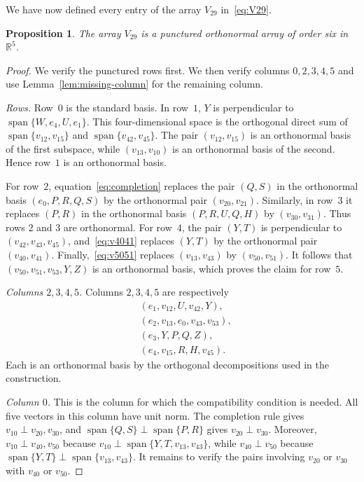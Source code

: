 \documentclass[11pt]{article}
\newtheorem{proposition}[theorem]{Proposition}
\theoremstyle{definition}
\newcommand{\R}{\mathbb R}
\newcommand{\spn}{\operatorname{span}}
\begin{document}
We have now defined every entry of the array $V_{29}$ in~\eqref{eq:V29}.

\begin{proposition}\label{prop:V29}
The array $V_{29}$ is a punctured orthonormal array of order six in $\R^5$.
\end{proposition}

\begin{proof}
We verify the punctured rows first.  We then verify columns $0,2,3,4,5$ and
use Lemma~\ref{lem:missing-column} for the remaining column.

\emph{Rows.}
Row~$0$ is the standard basis.  In row~$1$, $Y$ is perpendicular
to $\spn\{W,e_4,U,e_1\}$.  This four-dimensional space is the orthogonal
direct sum of $\spn\{v_{12},v_{15}\}$ and
$\spn\{v_{42},v_{45}\}$.  The pair $(v_{12},v_{15})$ is an orthonormal basis
of the first subspace, while $(v_{13},v_{10})$ is an orthonormal basis of the
second.  Hence row~$1$ is an orthonormal basis.

For row~$2$, equation~\eqref{eq:completion} replaces the pair $(Q,S)$ in the
orthonormal basis $(e_0,P,R,Q,S)$ by the orthonormal pair $(v_{20},v_{21})$.
Similarly, in row~$3$ it replaces $(P,R)$ in the orthonormal basis
$(P,R,U,Q,H)$ by $(v_{30},v_{31})$.  Thus rows $2$ and $3$ are orthonormal.
For row~$4$, the pair $(Y,T)$ is perpendicular to
$(v_{42},v_{43},v_{45})$, and~\eqref{eq:v4041} replaces $(Y,T)$ by the
orthonormal pair $(v_{40},v_{41})$.  Finally,~\eqref{eq:v5051} replaces
$(v_{13},v_{43})$ by $(v_{50},v_{51})$.  It follows that
$(v_{50},v_{51},v_{53},Y,Z)$ is an orthonormal basis, which proves the claim
for row~$5$.

\emph{Columns $2,3,4,5$.}
Columns $2,3,4,5$ are respectively
\begin{align*}
&(e_1,v_{12},U,v_{42},Y),\\
&(e_2,v_{13},e_0,v_{43},v_{53}),\\
&(e_3,Y,P,Q,Z),\\
&(e_4,v_{15},R,H,v_{45}).
\end{align*}
Each is an orthonormal basis by the orthogonal decompositions used in the
construction.

\emph{Column $0$.}
This is the column for which the compatibility condition is needed.  All five
vectors in this column have unit norm.  The completion rule gives
$v_{10}\perp v_{20},v_{30}$, and
$\spn\{Q,S\}\perp\spn\{P,R\}$ gives $v_{20}\perp v_{30}$.  Moreover,
$v_{10}\perp v_{40},v_{50}$ because
$v_{10}\perp\spn\{Y,T,v_{13},v_{43}\}$, while
$v_{40}\perp v_{50}$ because
$\spn\{Y,T\}\perp\spn\{v_{13},v_{43}\}$.  It remains to verify the pairs
involving $v_{20}$ or $v_{30}$ with $v_{40}$ or $v_{50}$.


\end{proof}
\end{document}
